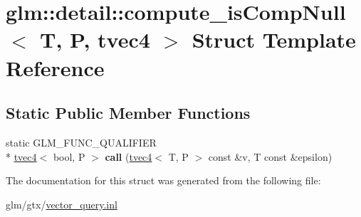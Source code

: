 \hypertarget{structglm_1_1detail_1_1compute__isCompNull_3_01T_00_01P_00_01tvec4_01_4}{\section{glm\-:\-:detail\-:\-:compute\-\_\-is\-Comp\-Null$<$ T, P, tvec4 $>$ Struct Template Reference}
\label{structglm_1_1detail_1_1compute__isCompNull_3_01T_00_01P_00_01tvec4_01_4}
}
\subsection*{Static Public Member Functions}
\begin{DoxyCompactItemize}
\item 
\hypertarget{structglm_1_1detail_1_1compute__isCompNull_3_01T_00_01P_00_01tvec4_01_4_a6c98752b295461f1d83f44ecbb22aadf}{static G\-L\-M\-\_\-\-F\-U\-N\-C\-\_\-\-Q\-U\-A\-L\-I\-F\-I\-E\-R \\*
\hyperlink{structglm_1_1tvec4}{tvec4}$<$ bool, P $>$ {\bfseries call} (\hyperlink{structglm_1_1tvec4}{tvec4}$<$ T, P $>$ const \&v, T const \&epsilon)}\label{structglm_1_1detail_1_1compute__isCompNull_3_01T_00_01P_00_01tvec4_01_4_a6c98752b295461f1d83f44ecbb22aadf}

\end{DoxyCompactItemize}


The documentation for this struct was generated from the following file\-:\begin{DoxyCompactItemize}
\item 
glm/gtx/\hyperlink{vector__query_8inl}{vector\-\_\-query.\-inl}\end{DoxyCompactItemize}
